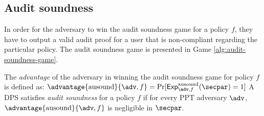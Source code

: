 \subsection{Audit soundness}

In order for the adversary to win the audit soundness game for a policy $f$, they have to output a valid audit proof for a user that is non-compliant regarding the particular policy. The audit soundness game is presented in Game \ref{alg:audit-soundness-game}.

\begin{definition}\label{def:audit-soundness}
    The \emph{advantage} of the adversary in winning the audit soundness game for policy $f$ is defined as:
    $
        \advantage{\auditsoundness}{\adv, f} = \Pr[\exper^{\auditsoundness}_{\adv, f}(\secpar)=1]
    $
    A DPS satisfies \emph{audit soundness} for a policy $f$ if for every PPT adversary $\adv$, $\advantage{\auditsoundness}{\adv, f}$ is negligible in  $\secpar$.
\end{definition}


